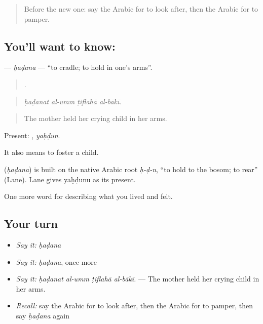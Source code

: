 \label{lesson:AR-C533-hadana}



\begin{quote}
Before the new one: say the Arabic for to look after, then the Arabic for to pamper.
\end{quote}

\subsection*{You'll want to know: }
\textbf{} — \emph{ḥaḍana} — \textquotedblleft{}to cradle; to hold in one's arms\textquotedblright{}.

\begin{quote}
   .
\end{quote}

\begin{quote}
\emph{ḥaḍanat al-umm ṭiflahā al-bākī.}
\end{quote}

\begin{quote}
The mother held her crying child in her arms.
\end{quote}

Present: , \emph{yaḥḍun}.

It also means to foster a child.

\begin{cousinweb}
\textbf{} (\emph{ḥaḍana}) is built on the native Arabic root \emph{ḥ-ḍ-n}, \textquotedblleft{}to hold to the bosom; to rear\textquotedblright{} (Lane). Lane gives yaḥḍunu as its present.
\end{cousinweb}

\begin{grammarlens}[title={What you've built}]
One more word for describing what you lived and felt.
\end{grammarlens}

\subsection*{Your turn}
\begin{itemize}
\raggedright
  \item \emph{Say it:} \emph{ḥaḍana}
  \item \emph{Say it:} \emph{ḥaḍana}, once more
  \item \emph{Say it:} \emph{ḥaḍanat al-umm ṭiflahā al-bākī.} — The mother held her crying child in her arms.
  \item \emph{Recall:} say the Arabic for to look after, then the Arabic for to pamper, then say \emph{ḥaḍana} again
\end{itemize}

